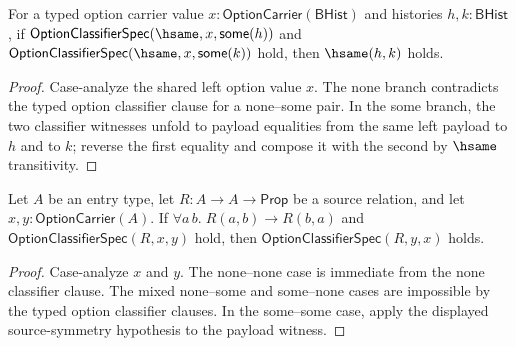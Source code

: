 \begin{theorem}
\label{thm:option-classifier-spec-hsame-right-payload-deterministic}
For a typed option carrier value $x:\mathsf{OptionCarrier}(\mathsf{BHist})$ and
histories $h,k:\mathsf{BHist}$, if
$\mathsf{OptionClassifierSpec}(\hsame,x,\mathsf{some}(h))$ and
$\mathsf{OptionClassifierSpec}(\hsame,x,\mathsf{some}(k))$ hold, then
$\hsame(h,k)$ holds.
\end{theorem}
\begin{proof}
Case-analyze the shared left option value $x$. The none branch contradicts the
typed option classifier clause for a none--some pair. In the some branch, the
two classifier witnesses unfold to payload equalities from the same left
payload to $h$ and to $k$; reverse the first equality and compose it with the
second by $\hsame$ transitivity.
\end{proof}

\begin{theorem}
\label{thm:option-classifier-symm-from-source-symmetry}
Let $A$ be an entry type, let $R:A\to A\to\mathsf{Prop}$ be a source relation, and let $x,y:\mathsf{OptionCarrier}(A)$. If
$\forall a\,b.\; R(a,b)\to R(b,a)$ and
$\mathsf{OptionClassifierSpec}(R,x,y)$ hold, then
$\mathsf{OptionClassifierSpec}(R,y,x)$ holds.
\end{theorem}
\begin{proof}
Case-analyze $x$ and $y$. The none--none case is immediate from the none classifier clause. The mixed none--some and some--none cases are impossible by the typed option classifier clauses. In the some--some case, apply the displayed source-symmetry hypothesis to the payload witness.
\end{proof}

